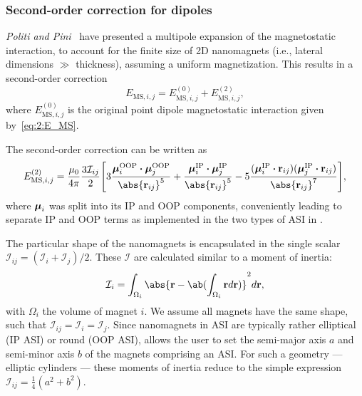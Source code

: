 \subsubsection{Second-order correction for dipoles}
\textit{Politi and Pini}~\cite{Dipolar2Dparticles} have presented a multipole expansion of the magnetostatic interaction, to account for the finite size of 2D nanomagnets (i.e., lateral dimensions $\gg$ thickness), assuming a uniform magnetization.
This results in a second-order correction
\begin{equation}
	E_{\mathrm{MS},i,j} = E_{\mathrm{MS},i,j}^\mathrm{(0)} + E_{\mathrm{MS},i,j}^\mathrm{(2)} \mathrm{,}
\end{equation}
where $E_{\mathrm{MS},i,j}^\mathrm{(0)}$ is the original point dipole magnetostatic interaction given by~\cref{eq:2:E_MS}. \par
The second-order correction can be written as
\begin{equation}
	E_{\mathrm{MS},i,j}^\mathrm{(2)} = \frac{\mu_0}{4\pi} \frac{3\mathcal{I}_{ij}}{2} \Bigg[3\frac{\vc{\mu}_i^\mathrm{OOP} \bcdot \vc{\mu}_j^\mathrm{OOP}}{\abs{\vc{r}_{ij}}^5} + \frac{\vc{\mu}_i^\mathrm{IP} \bcdot \vc{\mu}_j^\mathrm{IP}}{\abs{\vc{r}_{ij}}^5} -5\frac{(\vc{\mu}_i^\mathrm{IP} \bcdot \vc{r}_{ij}) (\vc{\mu}_j^\mathrm{IP} \bcdot \vc{r}_{ij})}{\abs{\vc{r}_{ij}}^7} \Bigg] \mathrm{,}
\end{equation}
where $\boldsymbol{\mathbf{\mu}}_i$ was split into its IP and OOP components, conveniently leading to separate IP and OOP terms as implemented in the two types of ASI in \hotspice. \par
The particular shape of the nanomagnets is encapsulated in the single scalar $\mathcal{I}_{ij} = (\mathcal{I}_i + \mathcal{I}_j)/2$.
These $\mathcal{I}$ are calculated similar to a moment of inertia:
\begin{equation}
	\mathcal{I}_i = \int_{\Omega_i} \abs{\vc{r} - \ab(\int_{\Omega_i} \vc{r} d\vc{r})}^2 d\vc{r} \mathrm{,}
\end{equation}
with $\Omega_i$ the volume of magnet $i$.
We assume all magnets have the same shape, such that $\mathcal{I}_{ij} = \mathcal{I}_i = \mathcal{I}_j$.
Since nanomagnets in ASI are typically rather elliptical (IP ASI) or round (OOP ASI), \hotspice allows the user to set the semi-major axis $a$ and semi-minor axis $b$ of the magnets comprising an ASI.
For such a geometry --- elliptic cylinders --- these moments of inertia reduce to the simple expression $\mathcal{I}_{ij} = \frac{1}{4}(a^2 + b^2)$. %

